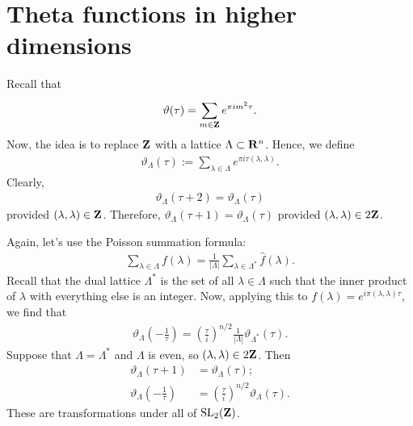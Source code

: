 \documentclass[11pt, oneside,margin=1in]{article}
\begin{document}
\section{Theta functions in higher dimensions}
Recall that
\begin{align*}
	\vartheta(\tau) =  \sum_{m\in\mathbf Z}^{} e^{\pi i m^2\tau}.
\end{align*}
Now, the idea is to replace $\mathbf Z$ with a lattice $\Lambda\subset \mathbf R^n$. Hence, we define
\begin{align*}
	\vartheta_\Lambda(\tau) :=  \sum_{\lambda\in \Lambda}^{} e^{\pi i\tau (\lambda,\lambda)}.
\end{align*}
Clearly,
\begin{align*}
	\vartheta_\Lambda(\tau + 2) = \vartheta_\Lambda (\tau)
\end{align*}
provided $(\lambda,\lambda) \in \mathbf Z$. Therefore, $\vartheta_\Lambda (\tau + 1) = \vartheta_\Lambda (\tau)$ provided $(\lambda,\lambda)\in 2\mathbf Z$.

Again, let's use the Poisson summation formula: 
\begin{align*}
	\sum_{\lambda\in \Lambda}^{} f(\lambda) =  \frac{1}{\left\lvert \Lambda \right\rvert }\sum_{\lambda\in \Lambda^* }^{} \widehat{f}(\lambda).
\end{align*}
Recall that the dual lattice $\Lambda^*$ is the set of all $\lambda\in \Lambda$ such that the inner product of $\lambda$ with everything else is an integer. Now, applying this to $f(\lambda) = e^{i\pi  (\lambda,\lambda) \tau}$, we find that
\begin{align*}
	\vartheta_{\Lambda} \left( -\frac{1}{\tau} \right) = \left( \frac{\tau}{i} \right) ^{n/2} \frac{1}{\left\lvert \Lambda \right\rvert } \vartheta_{\Lambda^*}(\tau).
\end{align*}
Suppose that $\Lambda =\Lambda^*$ and $\Lambda $ is even, so $(\lambda,\lambda)\in 2\mathbf Z$. Then
\begin{align*}
	\vartheta_{\Lambda } (\tau + 1) &= \vartheta_{\Lambda } (\tau);\\
	\vartheta_{\Lambda } \left( -\frac{1}{\tau} \right) &= \left( \frac{\tau}{i} \right) ^{n/2}\vartheta_{\Lambda }(\tau).
\end{align*}
These are transformations under all of $\operatorname{SL}_{2}(\mathbf Z)$.
\end{document}
